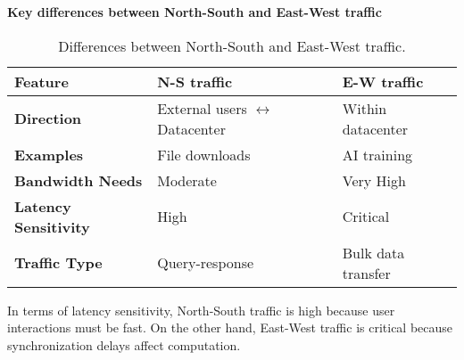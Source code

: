 \highspace
\begin{flushleft}
    \textcolor{Green3}{ \textbf{Key differences between North-South and East-West traffic}}
\end{flushleft}
\begin{table}[!htp]
    \centering
    \begin{tabular}{@{} l l l @{}}
        \toprule
        \textbf{Feature} & \textbf{N-S traffic} & \textbf{E-W traffic} \\
        \midrule
        \textbf{Direction} & External users $\leftrightarrow$ Datacenter & Within datacenter \\ [.5em]
        \textbf{Examples} & File downloads & AI training \\ [.5em]
        \textbf{Bandwidth Needs} & Moderate & Very High \\ [.5em]
        \textbf{Latency Sensitivity} & High & Critical \\ [.5em]
        \textbf{Traffic Type} & Query-response & Bulk data transfer \\
        \bottomrule
    \end{tabular}
    \caption{Differences between North-South and East-West traffic.}
\end{table}
In terms of latency sensitivity, North-South traffic is high because user interactions must be fast. On the other hand, East-West traffic is critical because synchronization delays affect computation.

\newpage

